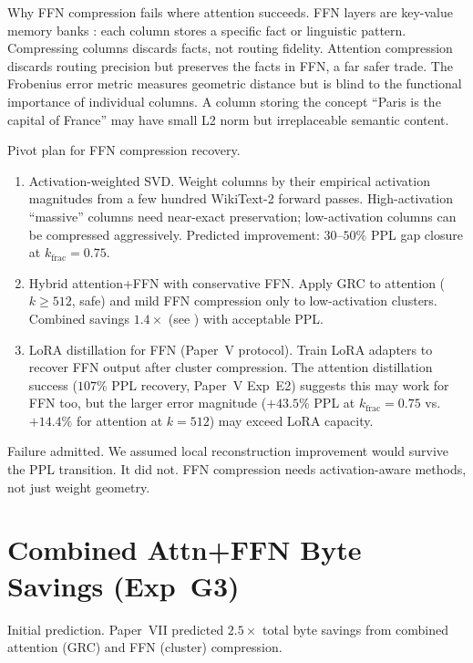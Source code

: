\documentclass[11pt]{article}
\begin{document}
Why FFN compression fails where attention succeeds.  FFN layers
are key-value memory banks \cite{geva2021ffn}: each column stores a
specific fact or linguistic pattern.  Compressing columns discards
facts, not routing fidelity.  Attention compression discards
routing precision but preserves the facts in FFN, a far safer trade.
The Frobenius error metric measures geometric distance but is blind to
the functional importance of individual columns.  A column storing the
concept ``Paris is the capital of France'' may have small L2 norm but
irreplaceable semantic content.

Pivot plan for FFN compression recovery.
\begin{enumerate}
\item Activation-weighted SVD.  Weight columns by their empirical
      activation magnitudes from a few hundred WikiText-2 forward passes.
      High-activation ``massive'' columns need near-exact preservation;
      low-activation columns can be compressed aggressively.  Predicted
      improvement: $30$--$50\%$ PPL gap closure at $k_\text{frac}{=}0.75$.
\item Hybrid attention+FFN with conservative FFN.  Apply GRC
      to attention ($k{\ge}512$, safe) and mild FFN compression only to
      low-activation clusters.  Combined savings $1.4{\times}$ (see
      ) with acceptable PPL.
\item LoRA distillation for FFN (Paper~V protocol).  Train LoRA
      adapters to recover FFN output after cluster compression.  The
      attention distillation success ($107\%$ PPL recovery, Paper~V Exp~E2)
      suggests this may work for FFN too, but the larger error magnitude
      ($+43.5\%$ PPL at $k_\text{frac}{=}0.75$ vs.\ $+14.4\%$ for
      attention at $k{=}512$) may exceed LoRA capacity.
\end{enumerate}

Failure admitted.  We assumed local reconstruction improvement
would survive the PPL transition.  It did not.  FFN compression needs
activation-aware methods, not just weight geometry.

\section{Combined Attn+FFN Byte Savings (Exp~G3)}
\label{sec:g3-combined}

Initial prediction.  Paper~VII predicted $2.5{\times}$ total byte
savings from combined attention (GRC) and FFN (cluster) compression.
\end{document}
